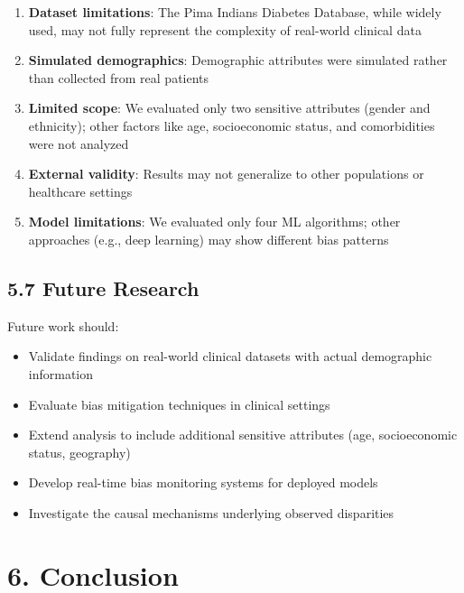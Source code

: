 \documentclass[12pt,a4paper]{article}
\begin{document}
\begin{enumerate}
    \item \textbf{Dataset limitations}: The Pima Indians Diabetes Database, 
          while widely used, may not fully represent the complexity of real-world 
          clinical data
    \item \textbf{Simulated demographics}: Demographic attributes were simulated 
          rather than collected from real patients
    \item \textbf{Limited scope}: We evaluated only two sensitive attributes 
          (gender and ethnicity); other factors like age, socioeconomic status, 
          and comorbidities were not analyzed
    \item \textbf{External validity}: Results may not generalize to other 
          populations or healthcare settings
    \item \textbf{Model limitations}: We evaluated only four ML algorithms; 
          other approaches (e.g., deep learning) may show different bias patterns
\end{enumerate}

\subsection{5.7 Future Research}

Future work should:

\begin{itemize}
    \item Validate findings on real-world clinical datasets with actual 
          demographic information
    \item Evaluate bias mitigation techniques in clinical settings
    \item Extend analysis to include additional sensitive attributes 
          (age, socioeconomic status, geography)
    \item Develop real-time bias monitoring systems for deployed models
    \item Investigate the causal mechanisms underlying observed disparities
\end{itemize}

\section{6. Conclusion}
\end{document}
